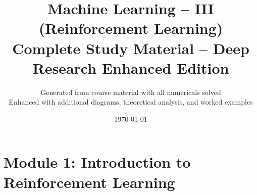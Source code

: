 \documentclass[11pt,a4paper]{article}
\title{\textbf{Machine Learning -- III (Reinforcement Learning)\\Complete Study Material -- Deep Research Enhanced Edition}}
\author{Generated from course material with all numericals solved\\Enhanced with additional diagrams, theoretical analysis, and worked examples}
\date{\today}
\begin{document}
\maketitle
\tableofcontents
\newpage

%


\section{Module 1: Introduction to Reinforcement Learning}
\end{document}
